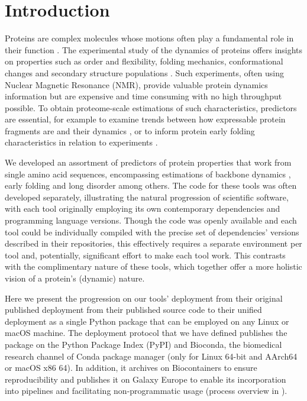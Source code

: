 \newpage
\section{Introduction}

Proteins are complex molecules whose motions often play a fundamental role in their function \cite{fenwick_integrated_2014, campbell_role_2016}. The experimental study of the dynamics of proteins offers insights on properties such as order and flexibility, folding mechanics, conformational changes and secondary structure populations \cite{berjanskii_nmr_2006, eaton_modern_2021}. Such experiments, often using Nuclear Magnetic Resonance (NMR), provide valuable protein dynamics information but are expensive and time consuming with no high throughput possible. To obtain \gls{proteome}-scale estimations of such characteristics, predictors are essential, for example to examine trends between how expressable protein fragments are and their dynamics \cite{boone_massively_2021}, or to inform protein early folding characteristics in relation to experiments  \cite{smets_evolutionary_2022}.

We developed an assortment of predictors of protein properties that work from single amino acid sequences, encompassing estimations of backbone dynamics \cite{cilia_protein_2013, cilia_dynamine_2014}, early folding \cite{raimondi_exploring_2017} and long disorder \cite{orlando_prediction_2022} among others. The code for these tools was often developed separately, illustrating the natural progression of scientific software, with each tool originally employing its own contemporary dependencies and programming language versions. Though the code was openly available and each tool could be individually compiled with the precise set of dependencies' versions described in their repositories, this effectively requires a separate environment per tool and, potentially, significant effort to make each tool work. This contrasts with the complimentary nature of these tools, which together offer a more holistic vision of a protein's (dynamic) nature.

Here we present the progression on our tools' deployment from their original published deployment from their published source code to their unified deployment as a single Python package that can be employed on any Linux or macOS machine. The deployment protocol that we have defined publishes the package on the Python Package Index (PyPI) \cite{pypi} and Bioconda, the biomedical research channel of Conda package manager (only for Linux 64-bit and AArch64 or macOS x86 64)\cite{gruning_bioconda_2018}. In addition, it archives on Biocontainers \cite{da_veiga_leprevost_biocontainers_2017} to ensure reproducibility and publishes it on Galaxy \cite{afgan_galaxy_2018} Europe to enable its incorporation into pipelines and facilitating non-programmatic usage (process overview in ). 

